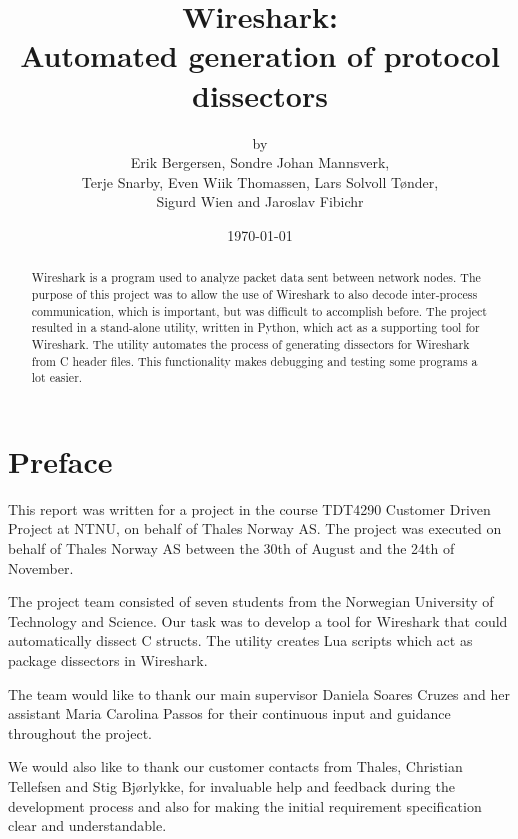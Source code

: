 \documentclass[a4paper, 11pt]{report}
\title{Wireshark:\\ Automated generation of protocol dissectors}
\author{by\\ Erik Bergersen, Sondre Johan Mannsverk,\\ Terje Snarby,
		Even Wiik Thomassen, Lars Solvoll Tønder,\\ Sigurd Wien
		and Jaroslav Fibichr}
\date{\today}
\begin{document}
\maketitle

\begin{abstract}
Wireshark is a program used to analyze packet data sent between network nodes.
The purpose of this project was to allow the use of Wireshark to also
decode inter-process communication, which is important, but was difficult to accomplish before.
The project resulted in a stand-alone utility, written in Python, which act as a supporting tool for Wireshark. 
The utility automates the process of generating dissectors for Wireshark from C header files. 
This functionality makes debugging and testing some programs a lot easier.
\end{abstract}

\chapter*{Preface}
This report was written for a project in the course TDT4290 
Customer Driven Project at NTNU, on behalf of Thales Norway AS. The project
was executed on behalf of Thales Norway AS between the 30th of August and
the 24th of November.

The project team consisted of seven students from the Norwegian University 
of Technology and Science. Our task was to develop a tool for Wireshark
that could automatically dissect C structs. The utility creates Lua scripts 
which act as package dissectors in Wireshark. 

The team would like to thank our main supervisor Daniela Soares Cruzes
and her assistant Maria Carolina Passos for their continuous input and
guidance throughout the project.

We would also like to thank our customer contacts from Thales, Christian
Tellefsen and Stig Bjørlykke, for invaluable help and feedback during the
development process and also for making the initial requirement 
specification clear and understandable.


\clearpage
{}
{}
\tableofcontents

\clearpage
{}
{}
\listoffigures
\end{document}
